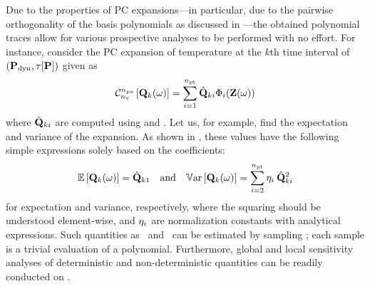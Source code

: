 Due to the properties of PC expansions---in particular, due to the pairwise orthogonality of the basis polynomials as discussed in ---the obtained polynomial traces allow for various prospective analyses to be performed with no effort. For instance, consider the PC expansion of temperature at the $k$th time interval of $\profilePdyn$ given as
\vspace{-0.2em}%
\begin{equation} \elabel{pc-k}
  \oPC{\nvars}{\pcorder}{\vTO_k(\o)} = \sum_{i = 1}^{\pcterms} \pcc{\vTO}_{ki} \pcb_i(\vZ(\o))
\end{equation}
\vspace{-0.2em}%
where $\hat{\mathbf{Q}}_{ki}$ are computed using  and . Let us, for example, find the expectation and variance of the expansion. As shown in , these values have the following simple expressions solely based on the coefficients:
\vspace{-0.2em}%
\begin{equation} \elabel{pc-moments}
  \oExp{\vTO_k(\o)} = \pcc{\vTO}_{k1} \hspace{1em} \text{and} \hspace{1em} \oVar{\vTO_k(\o)} = \sum_{i = 2}^{\pcterms} \pcn_i \: \pcc{\vTO}_{ki}^2
\end{equation}
\vspace{-0.2em}%
for expectation and variance, respectively, where the squaring should be understood element-wise, and $\eta_i$ are normalization constants with analytical expressions. Such quantities as \cdfs\ and \pdfs\ can be estimated by sampling ; each sample is a trivial evaluation of a polynomial. Furthermore, global and local sensitivity analyses of deterministic and non-deterministic quantities can be readily conducted on .

